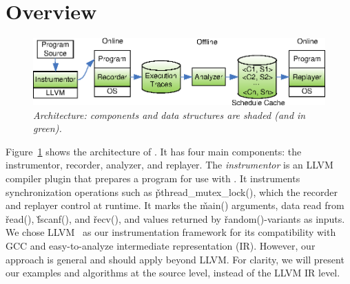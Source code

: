 \section{\peregrine Overview} \label{sec:overview}


\begin{figure}[t]
\centering
\includegraphics[width=.96\columnwidth]{peregrine/figures/overview.eps}
\caption{{\em \peregrine Architecture: components and data structures are
    shaded (and in green).}}\label{fig:arch}
\end{figure}


Figure~\ref{fig:arch} shows the architecture of \peregrine.  It has four main
components: the instrumentor, recorder, analyzer, and
replayer.  The \emph{instrumentor} is an LLVM~\cite{llvm} compiler plugin
that prepares a program for use with \peregrine.  It instruments synchronization
operations such as \v{pthread\_mutex\_lock()}, which the recorder and
replayer control at runtime.  It marks the \v{main()} arguments, data read
from \v{read()}, \v{fscanf()}, and \v{recv()}, and values
returned by \v{random()}-variants as
inputs.  We chose LLVM~\cite{llvm} as our instrumentation framework for
its compatibility with GCC and easy-to-analyze intermediate representation
(IR).  However, our approach is general and should apply beyond LLVM.
For clarity, we will present our examples and algorithms at the
source level, instead of the LLVM IR level.

